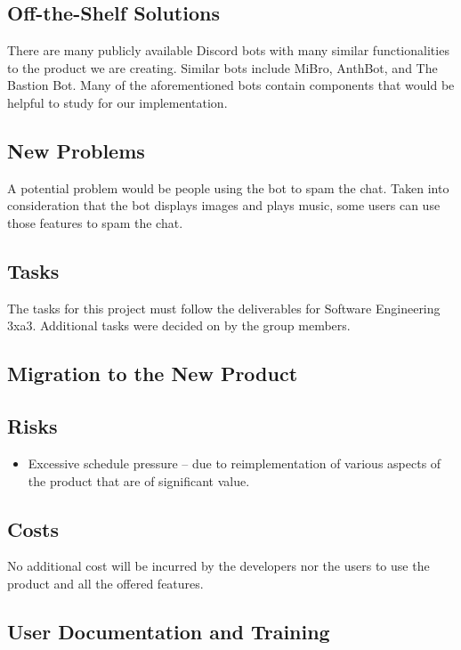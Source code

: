\documentclass[12pt, titlepage]{article}
\begin{document}
\subsection{Off-the-Shelf Solutions}

There are many publicly available Discord  bots with many similar functionalities to the product we are creating. Similar bots include MiBro, AnthBot, and The Bastion Bot. Many of the aforementioned bots contain components that would be helpful to study for our implementation.

\subsection{New Problems}
A potential problem would be people using the bot to spam the chat. Taken into consideration that the bot displays images and plays music, some users can use those features to spam the chat.

\subsection{Tasks}
The tasks for this project must follow the deliverables for Software Engineering 3xa3. Additional tasks were decided on by the group members. 

\subsection{Migration to the New Product}

\subsection{Risks}

\begin{itemize}
\item Excessive schedule pressure – due to reimplementation of various aspects of the product that are of significant value.
\end{itemize}

\subsection{Costs}

No additional cost will be incurred by the developers nor the users to use the product and all the offered features. 

\subsection{User Documentation and Training}
\end{document}
